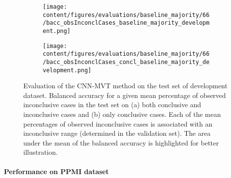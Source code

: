 \begin{figure}[ht]
  \begin{subfigure}{0.5\textwidth}
    \centering
    \texttt{[image: content/figures/evaluations/baseline\_majority/66/bacc\_obsInconclCases\_baseline\_majority\_development.png]}
    \subcaption{}
    \label{fig:bacc_obsInconclCases_baseline_majority_development}
  \end{subfigure}
  \hfill
  \begin{subfigure}{0.5\textwidth}
    \centering
    \texttt{[image: content/figures/evaluations/baseline\_majority/66/bacc\_obsInconclCases\_concl\_baseline\_majority\_development.png]}
    \subcaption{}
    \label{fig:bacc_obsInconclCases_concl_baseline_majority_development}
  \end{subfigure}

  \caption{Evaluation of the CNN-MVT method on the test set of development dataset.
  Balanced accuracy for a given mean percentage of observed inconclusive cases in the test set on 
  (a) both conclusive and inconclusive cases and (b) only conclusive cases. 
  Each of the mean percentages of observed inconclusive cases is associated with an inconclusive range (determined in the validation set). 
  The area under the mean of the balanced accuracy is highlighted for better illustration.}
  \label{fig:bacc_obsInconclCases_baseline_majority_development_full}
\end{figure}




\paragraph{Performance on PPMI dataset}

